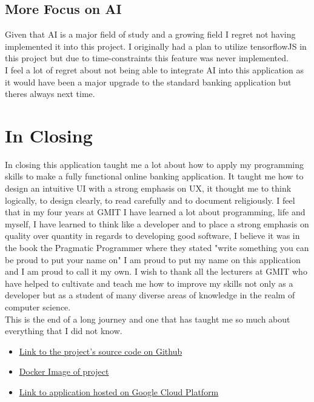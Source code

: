 \subsection{More Focus on AI}
Given that AI is a major field of study and a growing field I regret not having implemented it into this project.  I originally had a plan to utilize tensorflowJS in this project but due to time-constraints this feature was never implemented.
\\
I feel a lot of regret about not being able to integrate AI into this application as it would have been a major upgrade to the standard banking application but theres always next time.
\section{In Closing}
In closing this application taught me a lot about how to apply my programming skills to make a fully functional online banking application.  It taught me how to design an intuitive UI with a strong emphasis on UX, it thought me to think logically, to design clearly, to read carefully and to document religiously.  I feel that in my four years at GMIT I have learned a lot about programming, life and myself,  I have learned to think like a developer and to place a strong emphasis on quality over quantity in regards to developing good software,  I believe it was in the book the Pragmatic Programmer where they stated "write something you can be proud to put your name on" I am proud to put my name on this application and I am proud to call it my own.  I wish to thank all the lecturers at GMIT who have helped to cultivate and teach me how to improve my skills not only as a developer but as a student of many diverse areas of knowledge in the realm of computer science.
\\
This is the end of a long journey and one that has taught me so much about everything that I did not know.
\begin{appendices}
\begin{itemize}
\item \href{https://github.com/Ultan-Kearns/AppliedProject}{Link to the project's source code on Github}
\item \href{https://hub.docker.com/repository/docker/ultan/applied-project}{Docker Image of project}
\item \href{}{Link to application hosted on Google Cloud Platform}
\end{itemize}
\end{appendices}




